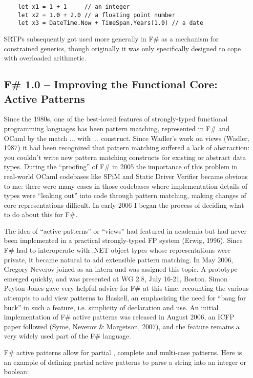\documentclass[acmsmall,review]{acmart}\settopmatter{printfolios=true,printccs=false,printacmref=false}
\begin{document}
\begin{verbatim}
    let x1 = 1 + 1     // an integer
    let x2 = 1.0 + 2.0 // a floating point number
    let x3 = DateTime.Now + TimeSpan.Years(1.0) // a date
\end{verbatim}

SRTPs subsequently got used more generally in F\# as a mechanism for constrained generics, though originally it was only specifically designed to cope with overloaded arithmetic.


\subsection*{F\# 1.0 – Improving the Functional Core: Active Patterns}

Since the 1980s, one of the best-loved features of strongly-typed functional programming languages has been pattern matching, represented in F\# and OCaml by the match ... with ... construct. Since Wadler’s work on views (Wadler, 1987) it had been recognized that pattern matching suffered a lack of abstraction: you couldn’t write new pattern matching constructs for existing or abstract data types.  During the “proofing” of F\# in 2005 the importance of this problem in real-world OCaml codebases like SPiM and Static Driver Verifier became obvious to me: there were many cases in those codebases where implementation details of types were “leaking out” into code through pattern matching, making changes of core representations difficult.  In early 2006 I began the process of deciding what to do about this for F\#.  

The idea of “active patterns” or “views” had featured in academia but had never been implemented in a practical strongly-typed FP system (Erwig, 1996).  Since F\# had to interoperate with .NET object types whose representations were private, it became natural to add extensible pattern matching. In May 2006, Gregory Neverov joined as an intern and was assigned this topic.  A prototype emerged quickly, and was presented at WG 2.8, July 16-21, Boston.  Simon Peyton Jones gave very helpful advice for F\# at this time, recounting the various attempts to add view patterns to Haskell, an emphasizing the need for “bang for buck” in such a feature, i.e. simplicity of declaration and use. An initial implementation of F\# active patterns was released in August 2006, an ICFP paper followed (Syme, Neverov \& Margetson, 2007), and the feature remains a very widely used part of the F\# language. 

F\# active patterns allow for partial , complete and multi-case patterns. Here is an example of defining partial active patterns to parse a string into an integer or boolean:
\end{document}
